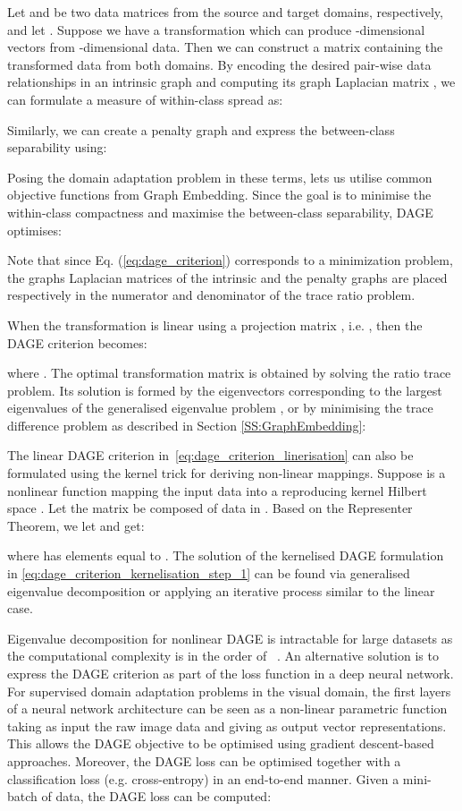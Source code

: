 \documentclass[journal]{IEEEtran}
\begin{document}
Let  and  be two data matrices from the source and target domains, respectively, and let . Suppose we have a transformation  which can produce -dimensional vectors from -dimensional data. Then we can construct a matrix  containing the transformed data from both domains. By encoding the desired pair-wise data relationships in an intrinsic graph  and computing its graph Laplacian matrix , we can formulate a measure of within-class spread as:

Similarly, we can create a penalty graph  and express the between-class separability using:


Posing the domain adaptation problem in these terms, lets us utilise common objective functions from Graph Embedding.
Since the goal is to minimise the within-class compactness and maximise the between-class separability, DAGE optimises:

Note that since Eq. (\ref{eq:dage_criterion}) corresponds to a minimization problem, the graphs Laplacian matrices of the intrinsic and the penalty graphs are placed respectively in the numerator and denominator of the trace ratio problem.

When the transformation is linear using a projection matrix , i.e. , then the DAGE criterion becomes:

where . The optimal transformation matrix  is obtained by solving the ratio trace problem. Its solution is formed by the eigenvectors corresponding to the  largest eigenvalues of the generalised eigenvalue problem , or by minimising the trace difference problem as described in Section \ref{SS:GraphEmbedding}:



The linear DAGE criterion in~\cref{eq:dage_criterion_linerisation} can also be formulated using the kernel trick for deriving non-linear mappings. Suppose  is a nonlinear function mapping the input data into a reproducing kernel Hilbert space . Let the matrix  be composed of data in . Based on the Representer Theorem, we let  and get:

where  has elements equal to . The solution of the kernelised DAGE formulation in \cref{eq:dage_criterion_kernelisation_step_1} can be found via generalised eigenvalue decomposition or applying an iterative process similar to the linear case.

Eigenvalue decomposition for nonlinear DAGE is intractable for large datasets as the computational complexity is in the order of ~\cite{pan1999eigencomplexity}. An alternative solution is to express the DAGE criterion as part of the loss function in a deep neural network. For supervised domain adaptation problems in the visual domain, the first layers of a neural network architecture can be seen as a non-linear parametric function  taking as input the raw image data and giving as output vector representations. This allows the DAGE objective to be optimised using gradient descent-based approaches. Moreover, the DAGE loss can be optimised together with a classification loss (e.g. cross-entropy) in an end-to-end manner. Given a mini-batch  of data, the DAGE loss can be computed:
\end{document}
